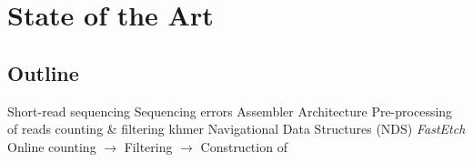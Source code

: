 \chapter{State of the Art}

\section{Outline}

\begin{outline}
    \1 Short-read sequencing
        \2 Sequencing errors
    \1 Assembler Architecture
        \2 \dBG
        \2 Pre-processing of reads
            \3 \kmer counting \& filtering
                \4 khmer\cite{Zhang2014}
    \1 Navigational Data Structures (NDS)
        \2 \cite{Chikhi2014}
    \1 \emph{FastEtch} \cite{Ghosh2019}
        \2 Online counting $\rightarrow$ Filtering $\rightarrow$ Construction of \dBG
\end{outline}